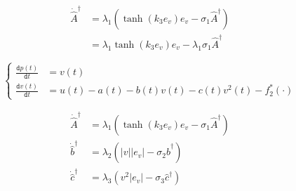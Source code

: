 \begin{equation}\label{eq:ch2-aligned}
	\begin{aligned}
		\dot{\hat{A}}^\dag
		&=\lambda_1\left(\tanh(k_3e_v)e_v-\sigma_1\hat{A}^\dag\right)\\
		&=\lambda_1\tanh(k_3e_v)e_v-\lambda_1\sigma_1\hat{A}^\dag
	\end{aligned}
\end{equation}

\begin{equation}\label{eq:ch2-split}
	\left\{
	\begin{split}
		\frac{\texttt{d}p(t)}{\texttt{d}t}&=v(t)\\
		\frac{\texttt{d}v(t)}{\texttt{d}t}&=u(t)-a(t)-b(t)v(t)-c(t)v^2(t)-f_2^*(\cdot)
	\end{split}
	\right.
\end{equation}




\begin{subequations}\label{eq:ch2-align}
	\begin{align}
		\dot{\hat{A}}^\dag&=\lambda_1\left(\tanh(k_3e_v)e_v-\sigma_1\hat{A}^\dag\right)\\
		\dot{\hat{b}}^\dag&=\lambda_2\left(|v||e_v|-\sigma_2\hat{b}^\dag\right)\\
		\dot{\hat{c}}^\dag&=\lambda_3\left(v^2|e_v|-\sigma_3\hat{c}^\dag\right)
	\end{align}
\end{subequations}

